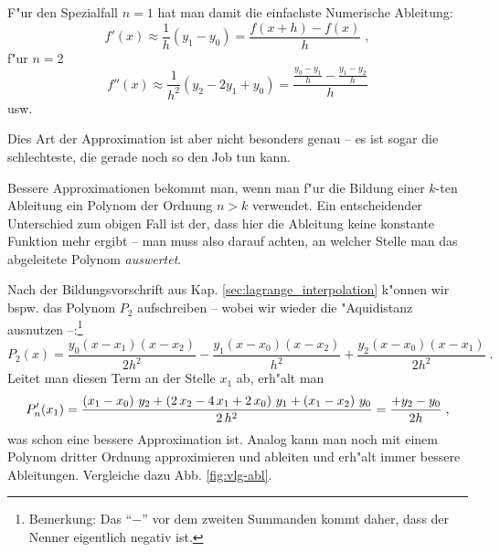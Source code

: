 \documentclass[a4paper]{book}
\newcommand{\abs}{\bigskip \noindent}
\begin{document}
F"ur den Spezialfall $n=1$ hat man damit die einfachste Numerische
Ableitung:
\begin{equation*}
  f'(x) \approx \frac{1}{h} (y_1 - y_0) = \frac{f(x+h) - f(x)}{h} \;,
\end{equation*}
f"ur $n=2$ 
\begin{equation*}
  f''(x) \approx \frac{1}{h^2} (y_2 - 2y_1 + y_0) = 
\frac{ \frac{y_0 - y_1}{h} - \frac{y_1 - y_2}{h} }{h} 
\end{equation*}
usw.

Dies Art der Approximation ist aber nicht besonders genau -- es ist
sogar die schlechteste, die gerade noch so den Job tun kann.

\abs
Bessere Approximationen bekommt man, wenn man f"ur die Bildung einer
$k$-ten Ableitung ein Polynom der Ordnung $n > k$ verwendet. Ein
entscheidender Unterschied zum obigen Fall ist der, dass hier die
Ableitung keine konstante Funktion mehr ergibt -- man muss also darauf
achten, an welcher Stelle man das abgeleitete Polynom
\emph{auswertet}.

Nach der Bildungsvorschrift aus Kap. \ref{sec:lagrange_interpolation}
k"onnen wir bspw. das Polynom $P_2$ aufschreiben -- wobei wir wieder
die "Aquidistanz ausnutzen --:\footnote{Bemerkung: Das "`$-$"' vor dem
zweiten Summanden kommt daher, dass der Nenner eigentlich negativ ist.}
\begin{equation*}
  P_2(x) = \frac{y_0 (x-x_1)(x-x_2)}{2h^2} 
- \frac{y_1 (x-x_0)(x-x_2)}{h^2} 
+ \frac{y_2 (x-x_0)(x-x_1)}{2h^2} \;.
\end{equation*}
Leitet man diesen Term an der Stelle $x_1$ ab, erh"alt man 
$$P'_n(x_1) = {{\left({ x_1}-{ x_0}\right)\,{ y_2}+\left(2\,{ x_2}-4
 \,{ x_1}+2\,{ x_0}\right)\,{ y_1}+\left({ x_1}-{ x_2}
 \right)\,{ y_0}}\over{2\,h^2}} =
\frac{+y_2 - y_0}{2h} \;,
$$
was schon eine bessere Approximation ist. Analog kann man noch mit
einem Polynom dritter Ordnung approximieren und ableiten und erh"alt
immer bessere Ableitungen. Vergleiche dazu Abb. \ref{fig:vlg-abl}.
\end{document}
